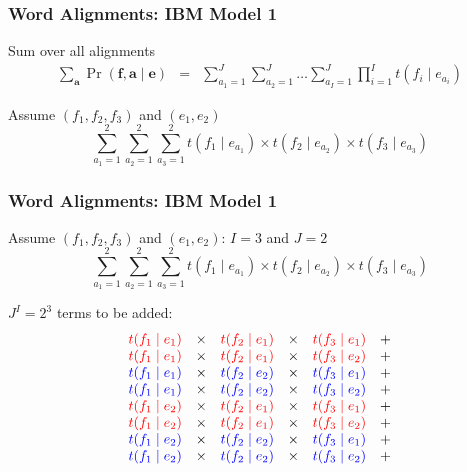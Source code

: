 \begin{frame}
\frametitle{Word Alignments: IBM Model 1}
\begin{block}{Sum over all alignments}
\begin{eqnarray*}
\sum_{\textbf{a}} \Pr(\textbf{f}, \textbf{a} \mid \textbf{e}) & = & 
\sum_{a_1 = 1}^J \sum_{a_2 = 1}^J \ldots \sum_{a_I = 1}^J \prod_{i=1}^I t(f_i \mid e_{a_i}) 
\end{eqnarray*}
\end{block}\pause
\begin{block}{Assume $(f_1, f_2, f_3)$ and $(e_1, e_2)$}
\[ \sum_{a_1=1}^2 \sum_{a_2=1}^2 \sum_{a_3=1}^2 t(f_1 \mid e_{a_1}) \times t(f_2 \mid e_{a_2}) \times t(f_3 \mid e_{a_3}) \]
\end{block}
\end{frame}

\begin{frame}
\frametitle{Word Alignments: IBM Model 1}
\begin{block}{Assume $(f_1, f_2, f_3)$ and $(e_1, e_2)$: $I=3$ and $J=2$}
\[ \sum_{a_1=1}^2 \sum_{a_2=1}^2 \sum_{a_3=1}^2 t(f_1 \mid e_{a_1}) \times t(f_2 \mid e_{a_2}) \times t(f_3 \mid e_{a_3}) \]
\end{block}
\begin{block}{$J^I = 2^3$ terms to be added:}
\[ 
\begin{array}{cccccc}
\color{red} t(f_1 \mid e_1) & \times & \color{red} t(f_2 \mid e_1) & \times & \color{red} t(f_3 \mid e_1) & + \\
\color{red} t(f_1 \mid e_1) & \times & \color{red} t(f_2 \mid e_1) & \times & \color{red} t(f_3 \mid e_2) & + \\
\color{blue} t(f_1 \mid e_1) & \times & \color{blue} t(f_2 \mid e_2) & \times & \color{blue} t(f_3 \mid e_1) & + \\
\color{blue} t(f_1 \mid e_1) & \times & \color{blue} t(f_2 \mid e_2) & \times & \color{blue} t(f_3 \mid e_2) & + \\
\color{red} t(f_1 \mid e_2) & \times & \color{red} t(f_2 \mid e_1) & \times & \color{red} t(f_3 \mid e_1) & + \\
\color{red} t(f_1 \mid e_2) & \times & \color{red} t(f_2 \mid e_1) & \times & \color{red} t(f_3 \mid e_2) & + \\
\color{blue} t(f_1 \mid e_2) & \times & \color{blue} t(f_2 \mid e_2) & \times & \color{blue} t(f_3 \mid e_1) & + \\
\color{blue} t(f_1 \mid e_2) & \times & \color{blue} t(f_2 \mid e_2) & \times & \color{blue} t(f_3 \mid e_2) & + \\
\end{array}
\]
\end{block}

\end{frame}

